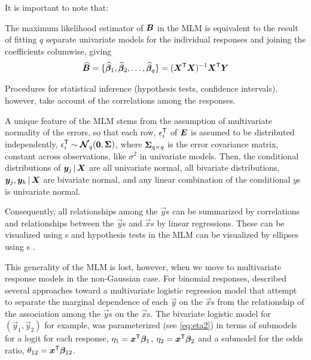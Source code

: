 \documentclass[11pt]{book}\usepackage[]{graphicx}\usepackage[]{color}
\begin{document}
It is important to note that:
\begin{itemize*}
  \item The maximum likelihood estimator of $\bm{B}$ in the MLM is equivalent to the result of fitting $q$ separate
  univariate models for the individual responses and joining the coefficients columwise, giving
\begin{equation*}
\widehat{\bm{B}} = \{ \widehat{\bm{\beta}}_1, \widehat{\bm{\beta}}_2, \dots , \widehat{\bm{\beta}}_q \}
                  = (\bm{X}^\mathsf{T} \bm{X})^{-1} \bm{X}^\mathsf{T} \bm{Y}
\end{equation*}
  \item Procedures for statistical inference (hypothesis tests, confidence intervals), however, take account of the correlations among the responses.
  \item A unique feature of the MLM stems from the assumption of multivariate normality of the errors,
  so that
  each row, $\epsilon_i ^\mathsf{T}$ of $\bm{E}$ is assumed to be distributed independently,
  $ \epsilon_i ^\mathsf{T} \sim \bm{\mathcal{N}}_q (\bm{0}, \bm{\Sigma})$, where $\bm{\Sigma}_{q \times q}$
  is the error covariance matrix, constant across observations, like $\sigma^2$ in univariate models. 
  Then, the conditional distributions of $\bm{y}_j \, | \, \bm{X}$ are all
  univariate normal, all bivariate distributions, $\bm{y}_j, \bm{y}_k \, | \, \bm{X}$ are bivariate normal,
  and any linear combination of the conditional $y$s is univariate normal.
  
  \item Consequently, all relationships among the $\vec{y}$s can be summarized by correlations and relationships between
  the $\vec{y}$s and $\vec{x}$s by linear regressions.  These can be visualized using
  s \citep{Friendly-etal:ellipses:2013} and hypothesis tests in the MLM can be visualized
  by ellipses
  using s
  \citep{Friendly:07:manova,FoxFriendlyMonette:09:compstat}.  
\end{itemize*}

This generality of the MLM is lost, however, when we move to multivariate response models in the non-Gaussian case.
For binomial responses,  described several approaches toward a multivariate logistic
regression model that attempt to separate the marginal dependence of each $\vec{y}$ on the $\vec{x}$s
from the relationship of the association among the $\vec{y}$s on the $\vec{x}$s.
The bivariate logistic model for $(\vec{y}_1, \vec{y}_2)$ 
for example, was parameterized (see \eqref{eq:eta2}) in terms of submodels for a logit for each response, 
$\eta_1 = \bm{x}^\mathsf{T} \bm{\beta}_1$,
$\eta_2 = \bm{x}^\mathsf{T} \bm{\beta}_2$
and a submodel for the odds ratio,
$\theta_{12} = \bm{x}^\mathsf{T} \bm{\beta}_{12}$.
\end{document}
